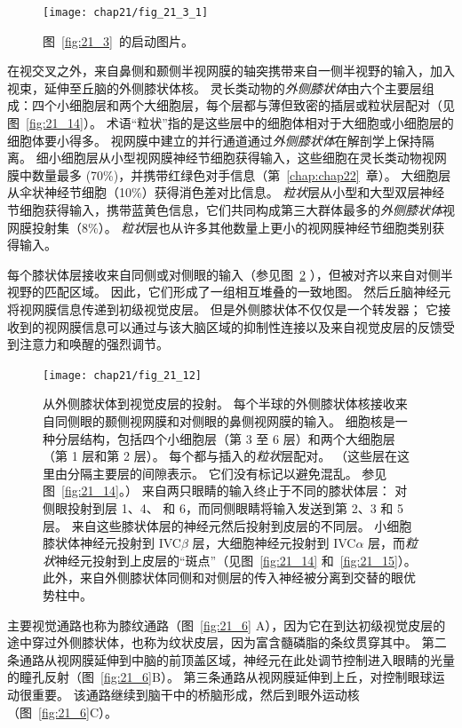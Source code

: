 \begin{figure}[htbp]
	\centering
	\texttt{[image: chap21/fig\_21\_3\_1]}
	\caption{图~\ref{fig:21_3}~的启动图片。}
	\label{fig:21_3_1}
\end{figure}


在视交叉之外，来自鼻侧和颞侧半视网膜的轴突携带来自一侧半视野的输入，加入视束，延伸至丘脑的外侧膝状体核。
灵长类动物的\textit{外侧膝状体}由六个主要层组成：四个小细胞层和两个大细胞层，每个层都与薄但致密的插层或粒状层配对（见图~\ref{fig:21_14}）。
术语“粒状”指的是这些层中的细胞体相对于大细胞或小细胞层的细胞体要小得多。
视网膜中建立的并行通道通过\textit{外侧膝状体}在解剖学上保持隔离。
细小细胞层从小型视网膜神经节细胞获得输入，这些细胞在灵长类动物视网膜中数量最多 (70\%)，并携带红绿色对手信息（第~\ref{chap:chap22}~章）。
大细胞层从伞状神经节细胞（10\%）获得消色差对比信息。
\textit{粒状}层从小型和大型双层神经节细胞获得输入，携带蓝黄色信息，它们共同构成第三大群体最多的\textit{外侧膝状体}视网膜投射集（8\%）。
\textit{粒状}层也从许多其他数量上更小的视网膜神经节细胞类别获得输入。


每个膝状体层接收来自同侧或对侧眼的输入（参见图~\ref{fig:21_12} ），但被对齐以来自对侧半视野的匹配区域。
因此，它们形成了一组相互堆叠的一致地图。
然后丘脑神经元将视网膜信息传递到初级视觉皮层。
但是外侧膝状体不仅仅是一个转发器；
它接收到的视网膜信息可以通过与该大脑区域的抑制性连接以及来自视觉皮层的反馈受到注意力和唤醒的强烈调节。


\begin{figure}[htbp]
	\centering
	\texttt{[image: chap21/fig\_21\_12]}
	\caption{从外侧膝状体到视觉皮层的投射。
		每个半球的外侧膝状体核接收来自同侧眼的颞侧视网膜和对侧眼的鼻侧视网膜的输入。
		细胞核是一种分层结构，包括四个小细胞层（第 3 至 6 层）和两个大细胞层（第 1 层和第 2 层）。
		每个都与插入的\textit{粒状}层配对。
		（这些层在这里由分隔主要层的间隙表示。
		它们没有标记以避免混乱。
		参见图~\ref{fig:21_14}。）
		来自两只眼睛的输入终止于不同的膝状体层：
		对侧眼投射到层 1、4、 和 6，而同侧眼睛将输入发送到第 2、3 和 5 层。
		来自这些膝状体层的神经元然后投射到皮层的不同层。
		小细胞膝状体神经元投射到 IVC$\beta$ 层，大细胞神经元投射到 IVC$\alpha$ 层，而\textit{粒状}神经元投射到上皮层的“斑点”（见图~\ref{fig:21_14} 和~\ref{fig:21_15}）。
		此外，来自外侧膝状体同侧和对侧层的传入神经被分离到交替的眼优势柱中。}
	\label{fig:21_12}
\end{figure}


主要视觉通路也称为膝纹通路（图~\ref{fig:21_6} A），因为它在到达初级视觉皮层的途中穿过外侧膝状体，也称为纹状皮层，因为富含髓磷脂的条纹贯穿其中。
第二条通路从视网膜延伸到中脑的前顶盖区域，神经元在此处调节控制进入眼睛的光量的瞳孔反射（图~\ref{fig:21_6}B）。
第三条通路从视网膜延伸到上丘，对控制眼球运动很重要。
该通路继续到脑干中的桥脑形成，然后到眼外运动核（图~\ref{fig:21_6}C）。


